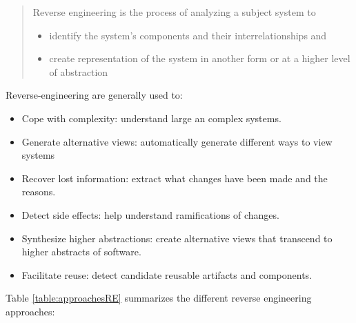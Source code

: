 \begin{quote} 
Reverse engineering is the process of analyzing a subject system to
\begin{itemize}
\item identify the system's components and their interrelationships and
\item create representation of the system in another form or at a higher level of abstraction
\end{itemize}
\end{quote}
Reverse-engineering are generally used to:
\begin{itemize}
\item Cope with complexity: understand large an complex systems.
\item Generate alternative views: automatically generate different ways to view systems
\item Recover lost information: extract what changes have been made and the reasons.
\item Detect side effects: help understand ramifications of changes.
\item Synthesize higher abstractions:  create alternative views that transcend to higher abstracts of software.
\item Facilitate reuse: detect candidate reusable artifacts and components.
\end{itemize}

Table \ref{table:approachesRE} summarizes the different reverse engineering approaches\cite{Chikofsky}: 


